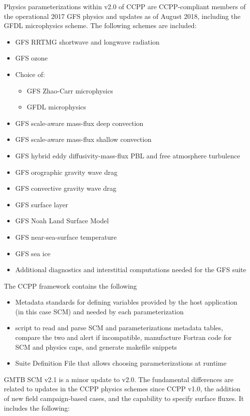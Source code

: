 Physics parameterizations within v2.0 of CCPP are CCPP-compliant members of the operational 2017 GFS physics and updates as of August 2018, including the GFDL microphysics scheme. The following schemes are included:
\begin{itemize}
	\item GFS RRTMG shortwave and longwave radiation
	\item GFS ozone
	\item Choice of:
	\begin{itemize}
	\item GFS Zhao-Carr microphysics
	\item GFDL microphysics
	\end{itemize}
	\item GFS scale-aware mass-flux deep convection
	\item GFS scale-aware mass-flux shallow convection
	\item GFS hybrid eddy diffusivity-mass-flux PBL and free atmosphere turbulence
	\item GFS orographic gravity wave drag
	\item GFS convective gravity wave drag
	\item GFS surface layer
	\item GFS Noah Land Surface Model
	\item GFS near-sea-surface temperature
	\item GFS sea ice
	\item Additional diagnostics and interstitial computations needed for the GFS suite
\end{itemize}

The CCPP framework contains the following
\begin{itemize}
\item Metadata standards for defining variables provided by the host application (in this case SCM) and needed by each parameterization
\item {} script to read and parse SCM and parameterizations metadata tables, compare the two and alert if incompatible, manufacture Fortran code for SCM and physics caps, and generate makefile snippets
\item Suite Definition File that allows choosing parameterizations at runtime
\end{itemize}

GMTB SCM v2.1 is a minor update to v2.0. The fundamental differences are related to updates in the CCPP physics schemes since CCPP v1.0, the addition of new field campaign-based cases, and the capability to specify surface fluxes. It includes the following:

